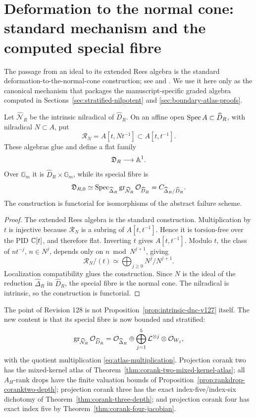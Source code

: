 \section{Deformation to the normal cone: standard mechanism and the computed special fibre}
\label{sec:rees-specialization-v127}

The passage from an ideal to its extended Rees algebra is the standard
deformation-to-the-normal-cone construction; see
\cite[\S5.1]{FultonIntersection} and
\cite[Tag 062Z]{StacksNormalCone}.  We use it here only as the
canonical mechanism that packages the manuscript-specific graded
algebra computed in Sections~\ref{sec:stratified-nilpotent} and
\ref{sec:boundary-atlas-proofs}.

\begin{proposition}
\label{prop:intrinsic-dnc-v127}
Let \(\widehat{\mathcal N}_R\) be the intrinsic nilradical of
\(\widehat D_R\).  On an affine open
\(\operatorname{Spec} A\subset\widehat D_R\), with nilradical \(N\subset A\), put
\[
 \mathscr R_N=A[t,Nt^{-1}]\subset A[t,t^{-1}].
\]
These algebras glue and define a flat family
\[
 \mathfrak D_R\longrightarrow\mathbb A^1.
\]
Over \(\mathbb G_m\) it is
\(\widehat D_R\times\mathbb G_m\), while its special fibre is
\[
 \mathfrak D_{R,0}
 \simeq
 \operatorname{Spec}_{\widehat\Delta_R}
 \operatorname{gr}_{\widehat{\mathcal N}_R}
 \mathcal O_{\widehat D_R}
 =
 C_{\widehat\Delta_R/\widehat D_R}.
\]
The construction is functorial for isomorphisms of the abstract
failure scheme.
\end{proposition}

\begin{proof}
The extended Rees algebra is the standard construction.  Multiplication
by \(t\) is injective because \(\mathscr R_N\) is a subring of
\(A[t,t^{-1}]\).  Hence it is torsion-free over the PID \(\mathbb C[t]\),
and therefore flat.  Inverting \(t\) gives
\(A[t,t^{-1}]\).  Modulo \(t\), the class of
\(n t^{-j}\), \(n\in N^j\), depends only on
\(n\bmod N^{j+1}\), giving
\[
 \mathscr R_N/(t)\simeq\bigoplus_{j\ge0}N^j/N^{j+1}.
\]
Localization compatibility glues the construction.  Since \(N\) is
the ideal of the reduction \(\widehat\Delta_R\) in
\(\widehat D_R\), the special fibre is the normal cone.  The
nilradical is intrinsic, so the construction is functorial.
\end{proof}

The point of Revision 128 is not Proposition~\ref{prop:intrinsic-dnc-v127}
itself.  The new content is that its special fibre is now bounded and
stratified:
\[
 \operatorname{gr}_{\widehat{\mathcal N}_R}\mathcal O_{\widehat D_R}
 =
 \mathcal O_{\widehat\Delta_R}
 \oplus
 \bigoplus_{j=1}^{5}
 \mathcal L^{\otimes j}\otimes\mathcal O_{W_j},
\]
with the quotient multiplication
\eqref{eq:atlas-multiplication}.  Projection corank two has the
mixed-kernel atlas of
Theorem~\ref{thm:corank-two-mixed-kernel-atlas}; all \(A_H\)-rank
drops have the finite valuation bounds of
Proposition~\ref{prop:rankdrop-coranktwo-depth}; projection corank
three has the exact index-five/index-six dichotomy of
Theorem~\ref{thm:corank-three-depth}; and projection corank four has
exact index five by
Theorem~\ref{thm:corank-four-jacobian}.

